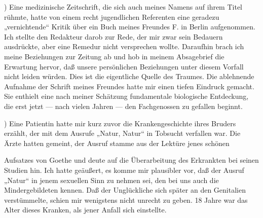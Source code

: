 \documentclass[twoside=true,titlepage=false,open=any, parskip=never, fontsize=10pt, headings=small, chapterprefix=false, appendixprefix=false]{scrbook}
\begin{document}
            
        ) Eine medizinische Zeitschrift, die sich auch meines
               Namens auf ihrem Titel rühmte, hatte von einem recht jugendlichen Referenten eine
               geradezu „vernichtende“ Kritik über ein Buch
               meines Freundes F. in Berlin aufgenommen. Ich stellte den Redakteur
               darob zur Rede, der mir zwar sein Bedauern ausdrückte, aber eine Remedur
               nicht versprechen wollte. Daraufhin brach ich meine Beziehungen zur
               Zeitung ab und hob in meinem Absagebrief die Erwartung hervor, daß unsere persönlichen Beziehungen unter diesem Vorfall nicht leiden würden.
               Dies ist die eigentliche Quelle des Traumes. Die ablehnende Aufnahme der Schrift
               meines Freundes hatte mir einen tiefen Eindruck gemacht. Sie enthielt eine
               nach meiner Schätzung fundamentale biologische Entdeckung, die erst
               jetzt — nach vielen Jahren — den Fachgenossen zu gefallen beginnt.
        \pend
    
            
        ) Eine Patientin hatte mir kurz zuvor die
               Krankengeschichte ihres Bruders erzählt, der mit dem Ausrufe „Natur,
               Natur“ in Tobsucht verfallen war. Die Ärzte
               hatten gemeint, der Ausruf stamme aus der Lektüre jenes schönen
        \pend
    
         
            
            
            
        \pstart
        Aufsatzes von Goethe und deute auf die
               Überarbeitung des Erkrankten bei seinen Studien hin. Ich hatte geäußert,
               es komme mir plausibler vor, daß der Ausruf
               „Natur“ in jenem sexuellen Sinn zu nehmen sei, den bei uns auch die
               Mindergebildeten kennen. Daß der Unglückliche sich später an den
               Genitalien verstümmelte, schien mir wenigstens nicht unrecht zu geben. 18 Jahre war das Alter dieses Kranken, als jener
               Anfall sich einstellte.
        \pend
    
\end{document}
